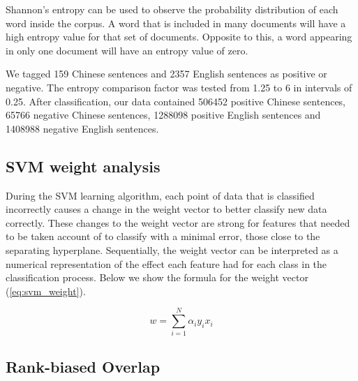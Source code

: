 Shannon’s entropy can be used to observe the probability distribution of each word inside the corpus. A word that is included in many documents will have a high entropy value for that set of documents. Opposite to this, a word appearing in only one document will have an entropy value of zero. 

We tagged 159 Chinese sentences and \num[group-separator={,}]{2357} English sentences as positive or negative. The entropy comparison factor was tested from 1.25 to 6 in intervals of 0.25. After classification, our data contained \num[group-separator={,}]{506452} positive Chinese sentences, \num[group-separator={,}]{65766} negative Chinese sentences, \num[group-separator={,}]{1288098} positive English sentences and \num[group-separator={,}]{1408988} negative English sentences. 

\subsection{SVM weight analysis}\label{svmweightsanalysis}

During the SVM learning algorithm, each point of data that is classified incorrectly causes a change in the weight vector to better classify new data correctly. These changes to the weight vector are strong for features that needed to be taken account of to classify with a minimal error, those close to the separating hyperplane. Sequentially, the weight vector can be interpreted as a numerical representation of the effect each feature had for each class in the classification process. Below we show the formula for the weight vector (\ref{eq:svm_weight}).

\begin{equation}\label{eq:svm_weight}
w = \sum_{i=1}^N \alpha_i y_i x_i
\end{equation}

\subsection{Rank-biased Overlap}\label{rbo}

